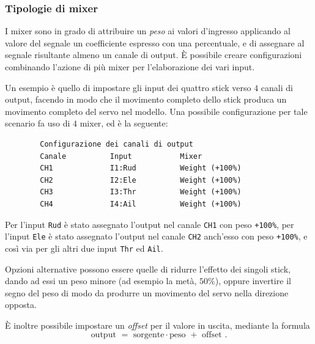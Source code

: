 \documentclass[a4paper, 12pt]{report} %
\begin{document}
\subsubsection{Tipologie di mixer}

I mixer sono in grado di attribuire un \emph{peso} ai valori d'ingresso applicando al valore del segnale un coefficiente espresso con una percentuale, e di assegnare al segnale risultante almeno un canale di output. È possibile creare configurazioni combinando l'azione di più mixer per l'elaborazione dei vari input.

Un esempio è quello di impostare gli input dei quattro stick verso $4$ canali di output, facendo in modo che il movimento completo dello stick produca un movimento completo del servo nel modello. Una possibile configurazione per tale scenario fa uso di $4$ mixer, ed è la seguente:

\begin{lstlisting}
        Configurazione dei canali di output
        Canale          Input           Mixer
        CH1             I1:Rud          Weight (+100%)
        CH2             I2:Ele          Weight (+100%)
        CH3             I3:Thr          Weight (+100%)
        CH4             I4:Ail          Weight (+100%)
\end{lstlisting}

Per l'input \texttt{Rud} è stato assegnato l'output nel canale \texttt{CH1} con peso \texttt{+100\%}, per l'input \texttt{Ele} è stato assegnato l'output nel canale \texttt{CH2} anch'esso con peso \texttt{+100\%}, e così via per gli altri due input \texttt{Thr} ed \texttt{Ail}.

Opzioni alternative possono essere quelle di ridurre l'effetto dei singoli stick, dando ad essi un peso minore (ad esempio la metà, $50\%$), oppure invertire il segno del peso di modo da produrre un movimento del servo nella direzione opposta.

È inoltre possibile impostare un \emph{offset} per il valore in uscita, mediante la formula
$$\mbox{output } = \mbox{ sorgente} \cdot \mbox{peso } + \mbox{ offset }.$$
\end{document}
